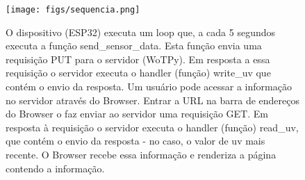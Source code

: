 \begin{figure}
    \centering
    \texttt{[image: figs/sequencia.png]}
    \caption{O dispositivo (ESP32) executa um loop que, a cada 5 segundos executa a função send\_sensor\_data. Esta função envia uma requisição PUT para o servidor (WoTPy). Em resposta a essa requisição o servidor executa o handler (função) write\_uv que contém o envio da resposta. Um usuário pode acessar a informação no servidor através do Browser. Entrar a URL na barra de endereços do Browser o faz enviar ao servidor uma requisição GET. Em resposta à requisição o servidor executa o handler (função) read\_uv, que contém o envio da resposta - no caso, o valor de uv mais recente. O Browser recebe essa informação e renderiza a página contendo a informação.}
    \label{fig:sequencia}
\end{figure}

